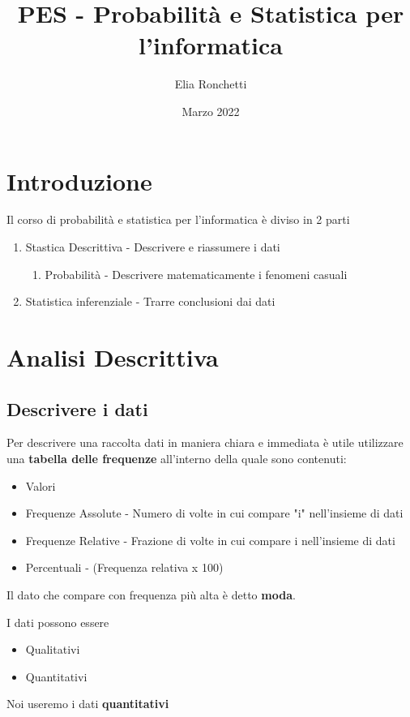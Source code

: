 \documentclass[12pt, a4paper, openany]{book}
\begin{document}
\title{PES - Probabilità e Statistica per l'informatica}
\author{Elia Ronchetti}
\date{Marzo 2022}

\maketitle
\tableofcontents
\chapter{Introduzione}
Il corso di probabilità e statistica per l'informatica è diviso in 2 parti
\begin{enumerate}
    \item Stastica Descrittiva - Descrivere e riassumere i dati
    \begin{enumerate}
        \item Probabilità - Descrivere matematicamente i fenomeni casuali
    \end{enumerate}
    \item Statistica inferenziale - Trarre conclusioni dai dati
\end{enumerate}

\chapter{Analisi Descrittiva}
\section{Descrivere i dati}
Per descrivere una raccolta dati in maniera chiara e immediata è utile utilizzare una \textbf{tabella delle frequenze}
all'interno della quale sono contenuti:
\begin{itemize}
    \item Valori
    \item Frequenze Assolute - Numero di volte in cui compare "i" nell'insieme di dati
    \item Frequenze Relative - Frazione di volte in cui compare i nell'insieme di dati
    \item Percentuali - (Frequenza relativa x 100)
\end{itemize}

Il dato che compare con frequenza più alta è detto \textbf{moda}.

I dati possono essere
\begin{itemize}
    \item Qualitativi
    \item Quantitativi 
\end{itemize}
Noi useremo i dati \textbf{quantitativi}
\end{document}
